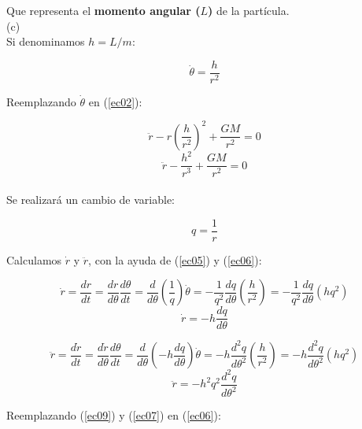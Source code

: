 \documentclass[letter,11pt]{article}
\begin{document}
Que representa el \textbf{momento angular ($L$)} de la partícula.
\\

(c) \\

Si denominamos $h=L/m$:

\begin{equation}
    \dot{\theta}=\frac{h}{r^2}
    \label{ec05}
\end{equation}

Reemplazando $\dot{\theta}$ en (\ref{ec02}):

\begin{equation*}
    \ddot{r}-r{\left(\frac{h}{r^2}\right)}^2+\frac{GM}{r^2}=0
\end{equation*}
\begin{equation}
    \ddot{r}-\frac{h^2}{r^3}+\frac{GM}{r^2}=0
    \label{ec06}
\end{equation}
\\

Se realizará un cambio de variable:

\begin{equation}
    q=\frac{1}{r}
    \label{ec07}
\end{equation}

Calculamos $\dot{r}$ y $\ddot{r}$, con la ayuda de (\ref{ec05}) y (\ref{ec06}):

\begin{equation*}
    \dot{r}=\frac{dr}{dt}
           =\frac{dr}{d\theta}\frac{d\theta}{dt}
           =\frac{d}{d\theta}\left(\frac{1}{q}\right)\dot{\theta}
           =-\frac{1}{q^2}\frac{dq}{d\theta}\left(\frac{h}{r^2}\right)
           =-\frac{1}{q^2}\frac{dq}{d\theta}(hq^2)
\end{equation*}
\begin{equation}
    \dot{r}=-h\frac{dq}{d\theta}
    \label{ec08}
\end{equation}

\begin{equation*}
    \ddot{r}=\frac{d\dot{r}}{dt}
            =\frac{d\dot{r}}{d\theta}\frac{d\theta}{dt}
            =\frac{d}{d\theta}\left(-h\frac{dq}{d\theta}\right)\dot{\theta}
            =-h\frac{d^2q}{d\theta^2}\left(\frac{h}{r^2}\right)
            =-h\frac{d^2q}{d\theta^2}(hq^2)
\end{equation*}
\begin{equation}
    \ddot{r}=-h^2q^2\frac{d^2q}{d\theta^2}
    \label{ec09}
\end{equation}

Reemplazando (\ref{ec09}) y (\ref{ec07}) en (\ref{ec06}):
\end{document}
